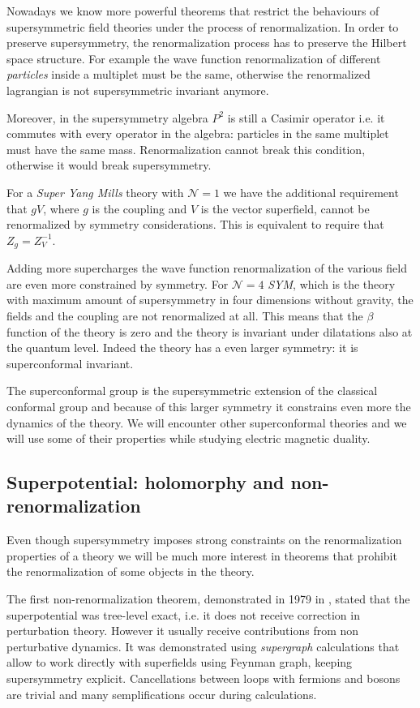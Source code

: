 Nowadays we know more powerful theorems that restrict the behaviours of supersymmetric field theories under the process of renormalization.
In order to preserve supersymmetry, the renormalization process has to preserve the Hilbert space structure. For example the wave function renormalization of different \emph{ particles} inside a multiplet must be the same, otherwise the renormalized lagrangian is not supersymmetric invariant anymore. 

Moreover, in the supersymmetry algebra $P^2$ is still a Casimir operator i.e. it commutes with every operator in the algebra: particles in the same multiplet must have the same mass.
Renormalization cannot break this condition, otherwise it would break supersymmetry.

For a \emph{Super Yang Mills} theory with $\mathcal{N} = 1$ we have the additional requirement that $g V$, where $g$ is the coupling and $V$ is the vector superfield, cannot be renormalized by symmetry considerations. This is equivalent to require that 
$ Z_g = Z_V^{-1}$.

Adding more supercharges the wave function renormalization of the various field are even more constrained by symmetry.
For $\mathcal{N}=4$ \emph{SYM}, which is the  theory with maximum amount of supersymmetry in four dimensions without gravity, the fields and the coupling are not renormalized at all.
This means that the $\beta$ function of the theory is zero and the theory is invariant under dilatations also at the quantum level.
Indeed the theory has a even larger symmetry: it is superconformal invariant.

The superconformal group is the supersymmetric extension of the classical conformal group and because of this larger symmetry it constrains even more the dynamics of the theory. 
We will encounter other superconformal theories and we will use some of their properties while studying electric magnetic duality. 


\subsection{Superpotential: holomorphy and non-renormalization}
Even though supersymmetry imposes strong constraints on the renormalization properties of a theory we will be much more interest in theorems that prohibit the renormalization of some objects in the theory.

The first non-renormalization theorem, demonstrated in 1979 in \cite{Grisaru:1979wc}, stated that the superpotential was tree-level exact, i.e. it does not receive correction in perturbation theory. 
However it usually receive contributions from non perturbative dynamics.
 It was demonstrated using \emph{supergraph} calculations that allow to work directly with superfields using Feynman graph, keeping supersymmetry explicit. 
 Cancellations between loops with fermions and bosons are trivial and many semplifications occur during calculations.

